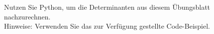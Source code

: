 \begin{ExerciseBlock}
Nutzen Sie Python, um die Determinanten aus diesem Übungsblatt nachzurechnen.\\
Hinweise: Verwenden Sie das zur Verfügung gestellte Code-Beispiel.
\end{ExerciseBlock}
